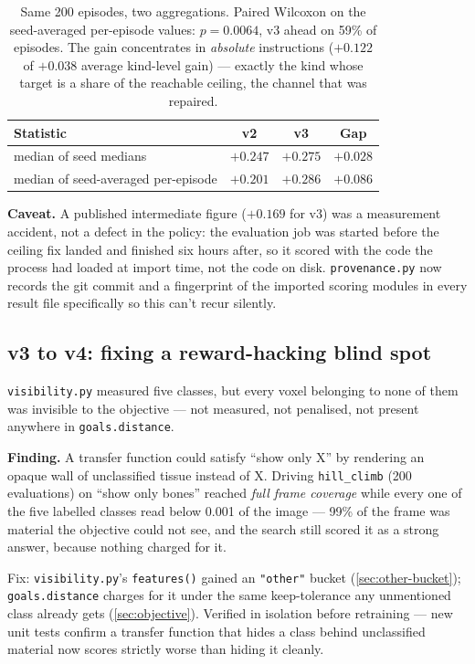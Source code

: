 \documentclass[10pt]{article}
\newcommand{\finding}[1]{\begin{findingbox}\textbf{Finding.} #1\end{findingbox}}
\newcommand{\caveattext}[1]{\begin{findingbox}[colframe=black!30]\textbf{Caveat.} #1\end{findingbox}}
\newcommand{\code}[1]{\texttt{#1}}
\begin{document}
\begin{table}[h]
\centering\small
\begin{tabular}{@{}lccc@{}}
\toprule
\textbf{Statistic} & \textbf{v2} & \textbf{v3} & \textbf{Gap} \\
\midrule
median of seed medians & $+0.247$ & $+0.275$ & $+0.028$ \\
median of seed-averaged per-episode & $+0.201$ & $+0.286$ & $+0.086$ \\
\bottomrule
\end{tabular}
\caption{Same 200 episodes, two aggregations. Paired Wilcoxon on the
seed-averaged per-episode values: $p = 0.0064$, v3 ahead on 59\% of episodes.
The gain concentrates in \emph{absolute} instructions ($+0.122$ of $+0.038$
average kind-level gain) --- exactly the kind whose target is a share of the
reachable ceiling, the channel that was repaired.}
\end{table}

\caveattext{A published intermediate figure ($+0.169$ for v3) was a
measurement accident, not a defect in the policy: the evaluation job was
started before the ceiling fix landed and finished six hours after, so it
scored with the code the process had loaded at import time, not the code on
disk. \code{provenance.py} now records the git commit and a fingerprint of
the imported scoring modules in every result file specifically so this
can't recur silently.}

\subsection{v3 to v4: fixing a reward-hacking blind spot}
\label{sec:v4-fix}

\code{visibility.py} measured five classes, but every voxel belonging to
none of them was invisible to the objective --- not measured, not
penalised, not present anywhere in \code{goals.distance}.

\finding{A transfer function could satisfy ``show only X'' by rendering an
opaque wall of unclassified tissue instead of X. Driving \code{hill\_climb}
(200 evaluations) on ``show only bones'' reached \emph{full frame coverage}
while every one of the five labelled classes read below 0.001 of the image
--- 99\% of the frame was material the objective could not see, and the
search still scored it as a strong answer, because nothing charged for it.}

Fix: \code{visibility.py}'s \code{features()} gained an \code{"other"}
bucket (\cref{sec:other-bucket}); \code{goals.distance} charges for it under
the same keep-tolerance any unmentioned class already gets
(\cref{sec:objective}). Verified in isolation before retraining --- new unit
tests confirm a transfer function that hides a class behind unclassified
material now scores strictly worse than hiding it cleanly.
\end{document}
